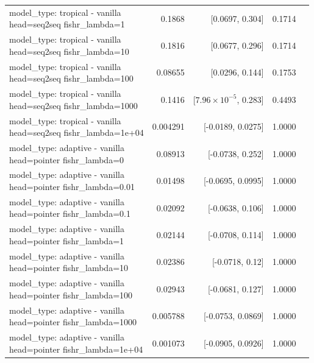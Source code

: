 \documentclass[10pt]{article}
\makeatletter
\newcommand{\stackcell}[1]{\begin{tabular}[t]{@{}l@{}}#1\end{tabular}}
\makeatother
\begin{document}
{\begin{longtable}{lrrrl}
\stackcell{model\_type: tropical - vanilla\\\footnotesize head=seq2seq fishr\_lambda=1 } & 0.1868 & [0.0697, 0.304] & 0.1714 & \\
\stackcell{model\_type: tropical - vanilla\\\footnotesize head=seq2seq fishr\_lambda=10 } & 0.1816 & [0.0677, 0.296] & 0.1714 & \\
\stackcell{model\_type: tropical - vanilla\\\footnotesize head=seq2seq fishr\_lambda=100 } & 0.08655 & [0.0296, 0.144] & 0.1753 & \\
\stackcell{model\_type: tropical - vanilla\\\footnotesize head=seq2seq fishr\_lambda=1000 } & 0.1416 & [$7.96\times10^{-5}$, 0.283] & 0.4493 & \\
\stackcell{model\_type: tropical - vanilla\\\footnotesize head=seq2seq fishr\_lambda=1e+04 } & 0.004291 & [-0.0189, 0.0275] & 1.0000 & \\
\stackcell{model\_type: adaptive - vanilla\\\footnotesize head=pointer fishr\_lambda=0 } & 0.08913 & [-0.0738, 0.252] & 1.0000 & \\
\stackcell{model\_type: adaptive - vanilla\\\footnotesize head=pointer fishr\_lambda=0.01 } & 0.01498 & [-0.0695, 0.0995] & 1.0000 & \\
\stackcell{model\_type: adaptive - vanilla\\\footnotesize head=pointer fishr\_lambda=0.1 } & 0.02092 & [-0.0638, 0.106] & 1.0000 & \\
\stackcell{model\_type: adaptive - vanilla\\\footnotesize head=pointer fishr\_lambda=1 } & 0.02144 & [-0.0708, 0.114] & 1.0000 & \\
\stackcell{model\_type: adaptive - vanilla\\\footnotesize head=pointer fishr\_lambda=10 } & 0.02386 & [-0.0718, 0.12] & 1.0000 & \\
\stackcell{model\_type: adaptive - vanilla\\\footnotesize head=pointer fishr\_lambda=100 } & 0.02943 & [-0.0681, 0.127] & 1.0000 & \\
\stackcell{model\_type: adaptive - vanilla\\\footnotesize head=pointer fishr\_lambda=1000 } & 0.005788 & [-0.0753, 0.0869] & 1.0000 & \\
\stackcell{model\_type: adaptive - vanilla\\\footnotesize head=pointer fishr\_lambda=1e+04 } & 0.001073 & [-0.0905, 0.0926] & 1.0000 & \\

\end{longtable}}
\end{document}
